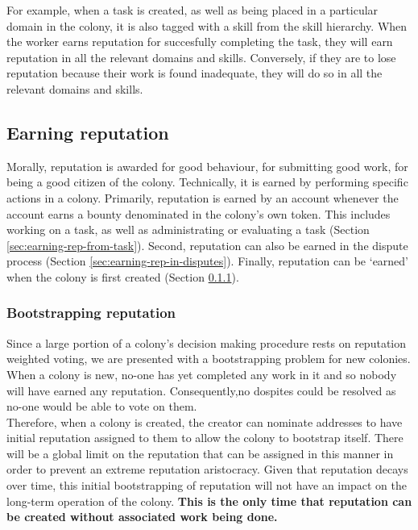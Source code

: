 For example, when a task is created, as well as being placed in a particular domain in the colony, it is also tagged with a skill from the skill hierarchy. When the worker earns reputation for succesfully completing the task, they will earn reputation in all the relevant domains and skills. Conversely, if they are to lose reputation because their work is found inadequate, they will do so in all the relevant domains and skills.

\subsection{Earning reputation}\label{sec:earning-rep}
Morally, reputation is awarded for good behaviour, for submitting good work, for being a good citizen of the colony. Technically, it is earned by performing specific actions in a colony. Primarily, reputation is earned by an account whenever the account earns a bounty denominated in the colony's own token. This includes working on a task, as well as administrating or evaluating a task (Section \ref{sec:earning-rep-from-task}). Second, reputation can also be earned in the dispute process (Section \ref{sec:earning-rep-in-disputes}). Finally, reputation can be `earned' when the colony is first created (Section \ref{sec:bootstrapping-rep}).

\subsubsection{Bootstrapping reputation}\label{sec:bootstrapping-rep}
Since a large portion of a colony's decision making procedure rests on reputation weighted voting, we are presented with a bootstrapping problem for new colonies.
When a colony is new, no-one has yet completed any work in it and so nobody will have earned any reputation. Consequently,no dospites could be resolved as no-one would be able to vote on them. \\
Therefore, when a colony is created, the creator can nominate addresses to have initial reputation assigned to them to allow the colony to bootstrap itself. There will be a global limit on the reputation that can be assigned in this manner in order to prevent an extreme reputation aristocracy. Given that reputation decays over time, this initial bootstrapping of reputation will not have an impact on the long-term operation of the colony. \textbf{This is the only time that reputation can be created without associated work being done.}

